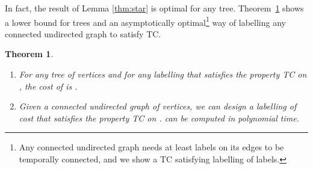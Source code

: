 \documentclass[a4paper,UKenglish]{article}
\newtheorem{theorem}{Theorem}
\begin{document}
In fact, the result of Lemma \ref{thm:star} is optimal for any tree. Theorem~\ref{thm:thmdesign} shows a lower bound for trees and an asymptotically optimal\footnote{Any connected undirected graph needs at least  labels on its edges to be temporally connected, and we show a TC satisfying labelling of  labels.} way of labelling any connected undirected graph to satisfy TC.


\begin{theorem}\label{thm:thmdesign}
\begin{enumerate}[label=(\alph*)]
\item For any tree  of  vertices and for any labelling  that satisfies the property TC on , the cost of  is .
\item Given a connected undirected graph  of  vertices, we can design a labelling  of cost  that satisfies the property TC on .  can be computed in polynomial time.
\end{enumerate}
\end{theorem}
\end{document}
